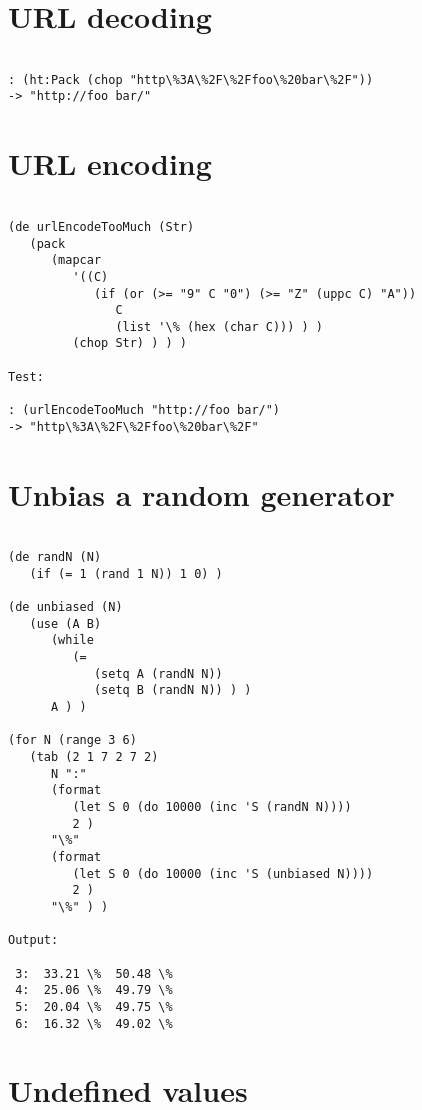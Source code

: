\section*{URL decoding}

\begin{verbatim}

: (ht:Pack (chop "http\%3A\%2F\%2Ffoo\%20bar\%2F"))
-> "http://foo bar/"

\end{verbatim}

\section*{URL encoding}

\begin{verbatim}

(de urlEncodeTooMuch (Str)
   (pack
      (mapcar
         '((C)
            (if (or (>= "9" C "0") (>= "Z" (uppc C) "A"))
               C
               (list '\% (hex (char C))) ) )
         (chop Str) ) ) )

Test:

: (urlEncodeTooMuch "http://foo bar/")
-> "http\%3A\%2F\%2Ffoo\%20bar\%2F"

\end{verbatim}

\section*{Unbias a random generator}

\begin{verbatim}

(de randN (N)
   (if (= 1 (rand 1 N)) 1 0) )

(de unbiased (N)
   (use (A B)
      (while
         (=
            (setq A (randN N))
            (setq B (randN N)) ) )
      A ) )

(for N (range 3 6)
   (tab (2 1 7 2 7 2)
      N ":"
      (format
         (let S 0 (do 10000 (inc 'S (randN N))))
         2 )
      "\%"
      (format
         (let S 0 (do 10000 (inc 'S (unbiased N))))
         2 )
      "\%" ) )

Output:

 3:  33.21 \%  50.48 \%
 4:  25.06 \%  49.79 \%
 5:  20.04 \%  49.75 \%
 6:  16.32 \%  49.02 \%

\end{verbatim}

\section*{Undefined values}

